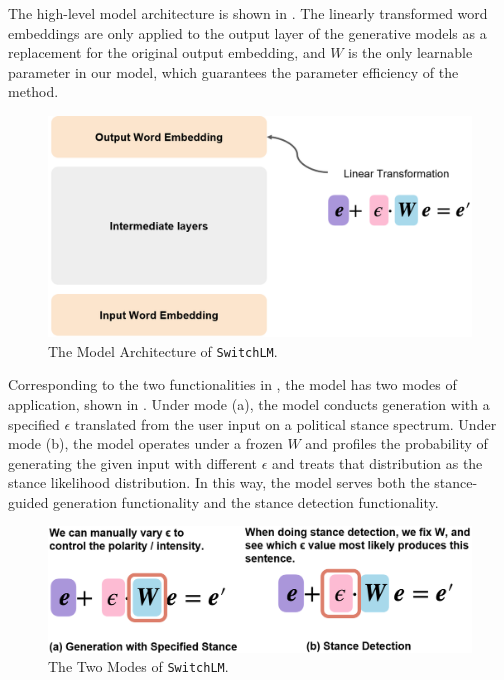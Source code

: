 The high-level model architecture is shown in . The linearly transformed word embeddings are only applied to the output layer of the generative models as a replacement for the original output embedding, and $W$ is the only learnable parameter in our model, which guarantees the parameter efficiency of the method.

\begin{figure}[ht]
    \centering
    \includegraphics[width=\textwidth]{img/switch-design}
    \caption{The Model Architecture of \texttt{SwitchLM}.}
    \label{fig:switch-design}
\end{figure}

Corresponding to the two functionalities in , the model has two modes of application, shown in . Under mode (a), the model conducts generation with a specified $\epsilon$ translated from the user input on a political stance spectrum. Under mode (b), the model operates under a frozen $W$ and profiles the probability of generating the given input with different $\epsilon$ and treats that distribution as the stance likelihood distribution. In this way, the model serves both the stance-guided generation functionality and the stance detection functionality.

\begin{figure}[h]
    \centering
    \includegraphics[width=\textwidth]{img/switch-func}
    \caption{The Two Modes of \texttt{SwitchLM}.}
    \label{fig:switch-func}
\end{figure}

